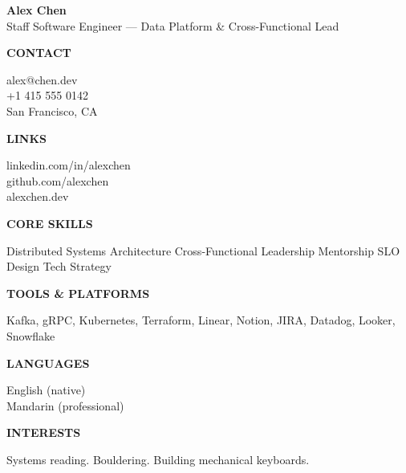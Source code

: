 \documentclass[letterpaper,10pt]{article}
\newcommand{\sidehead}[1]{%
  \vspace{6pt}
  {\bfseries\fontsize{10}{12}\selectfont\textcolor{modBody}{\MakeUppercase{#1}}}
  \vspace{2pt}
}
\newcommand{\sidebody}[1]{%
  {\fontsize{9.5}{12}\selectfont\textcolor{modBody}{#1}}
}
\newcommand{\sideacc}[1]{%
  {\fontsize{9}{12}\selectfont\textcolor{modAccent}{#1}}
}
\begin{document}
\noindent\begin{tcolorbox}[colback=modAccent, colframe=modAccent, boxrule=0pt,
  left=14pt, right=14pt, top=12pt, bottom=12pt, arc=0pt]
  {\color{white}\bfseries\fontsize{22}{26}\selectfont Alex Chen} \\[4pt]
  {\color{white}\fontsize{10.5}{14}\selectfont Staff Software Engineer --- Data Platform \& Cross-Functional Lead}
\end{tcolorbox}

\vspace{6pt}

\noindent\begin{minipage}[t]{1.85in}
\begin{sidebar}
\sidehead{Contact}
\sidebody{alex@chen.dev} \\
\sidebody{+1 415 555 0142} \\
\sidebody{San Francisco, CA}

\sidehead{Links}
\sideacc{linkedin.com/in/alexchen} \\
\sideacc{github.com/alexchen} \\
\sideacc{alexchen.dev}

\sidehead{Core Skills}
\sideacc{Distributed Systems \textperiodcentered{} Architecture \textperiodcentered{} Cross-Functional Leadership \textperiodcentered{} Mentorship \textperiodcentered{} SLO Design \textperiodcentered{} Tech Strategy}

\sidehead{Tools \& Platforms}
\sidebody{Kafka, gRPC, Kubernetes, Terraform, Linear, Notion, JIRA, Datadog, Looker, Snowflake}

\sidehead{Languages}
\sidebody{English (native) \\ Mandarin (professional)}

\sidehead{Interests}
\sidebody{Systems reading. Bouldering. Building mechanical keyboards.}
\end{sidebar}
\end{minipage}%
\hfill
\end{document}
